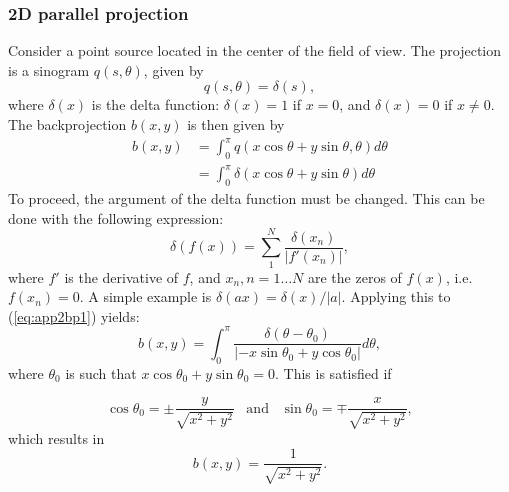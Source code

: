 \documentclass[11pt,oneside]{article}
\begin{document}
\subsubsection{2D parallel projection}
Consider a point source located in the center of the field of view.
The projection is a sinogram $q(s, \theta)$, given by
\begin{equation}
  q(s, \theta) = \delta(s),
\end{equation}
where $\delta(x)$ is the delta function: $\delta(x) = 1$ if $x = 0$, and
$\delta(x) = 0$ if $x \neq 0$.
The backprojection $b(x,y)$ is then given by
\begin{align}
  b(x,y) &= \int_0^\pi q(x \cos\theta + y\sin\theta, \theta)
                d\theta \nonumber\\
         &= \int_0^\pi \delta(x\cos\theta + y\sin\theta) d\theta
                \label{eq:app2bp1}
\end{align}
To proceed, the argument of the delta function must be changed. This
can be done with the following expression:
\begin{equation}
  \delta(f(x)) = \sum_1^N \frac{\delta(x_n)}{|f'(x_n)|},
\end{equation}
where $f'$ is the derivative of $f$, and $x_n, n=1 \ldots N$ are the
zeros of $f(x)$, i.e. $f(x_n) = 0$. A simple example is $\delta(ax) =
\delta(x) / |a|$. Applying this to (\ref{eq:app2bp1}) yields:
\begin{equation}
 b(x,y)  =  \int_0^\pi \frac{\delta(\theta - \theta_0)}
                              {|-x\sin\theta_0 + y\cos\theta_0|} d\theta,
\end{equation}
where $\theta_0$ is such that $x\cos\theta_0 + y\sin\theta_0 =
0$. This is satisfied if

\begin{equation}
  \cos\theta_0 = \pm \frac{y}{\sqrt{x^2+y^2}} 
       \;\;\;\mbox{and}\;\;\;
  \sin\theta_0 = \mp \frac{x}{\sqrt{x^2+y^2}},
\end{equation}
which results in
\begin{equation}
  b(x,y) = \frac{1}{\sqrt{x^2 + y^2}}.
\end{equation}
\end{document}
